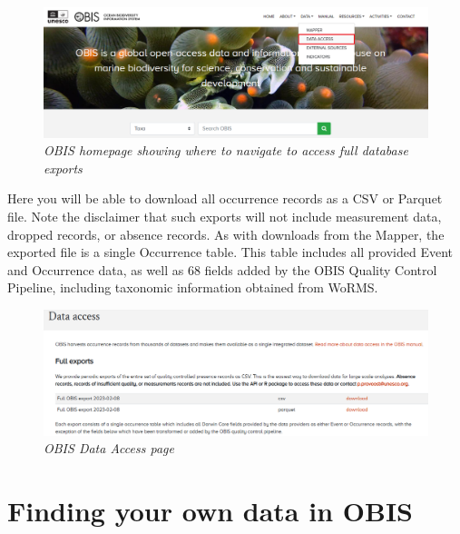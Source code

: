 \documentclass[
  letterpaper,
  DIV=11,
  numbers=noendperiod,
  oneside]{scrreprt}
\begin{document}
\begin{figure}

{\centering \includegraphics{images/full-export1.png}

}

\caption{\emph{OBIS homepage showing where to navigate to access full
database exports}}

\end{figure}

Here you will be able to download all occurrence records as a CSV or
Parquet file. Note the disclaimer that such exports will not include
measurement data, dropped records, or absence records. As with downloads
from the Mapper, the exported file is a single Occurrence table. This
table includes all provided Event and Occurrence data, as well as 68
fields added by the OBIS Quality Control Pipeline, including taxonomic
information obtained from WoRMS.

\begin{figure}

{\centering \includegraphics{images/full-export2.png}

}

\caption{\emph{OBIS Data Access page}}

\end{figure}

\hypertarget{finding-your-own-data-in-obis}{%
\section{Finding your own data in
OBIS}\label{finding-your-own-data-in-obis}}
\end{document}
